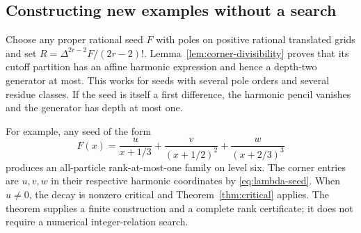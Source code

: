 \subsection{Constructing new examples without a search}
Choose any proper rational seed $F$ with poles on positive rational
translated grids and set $R=\Delta^{2r-2}F/(2r-2)!$.
Lemma~\ref{lem:corner-divisibility} proves that its cutoff partition has
an affine harmonic expression and hence a depth-two generator at most.
This works for seeds with several pole orders and several residue classes.
If the seed is itself a first difference, the harmonic pencil vanishes
and the generator has depth at most one.

For example, any seed of the form
\[
 F(x)=\frac{u}{x+1/3}+\frac{v}{(x+1/2)^2}
                         +\frac{w}{(x+2/3)^3}
\]
produces an all-particle rank-at-most-one family on level six. The corner
entries are $u,v,w$ in their respective harmonic coordinates by
\eqref{eq:lambda-seed}. When $u\ne0$, the decay is nonzero critical
and Theorem~\ref{thm:critical} applies. The theorem supplies a finite
construction and a complete rank certificate; it does not require a
numerical integer-relation search.
